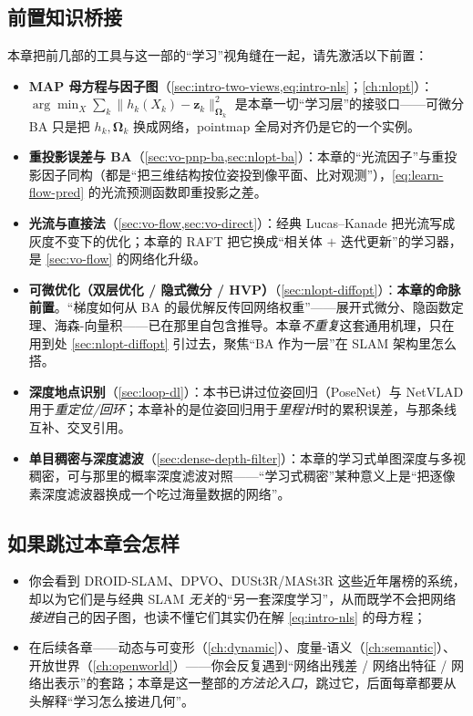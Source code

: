 \subsection*{前置知识桥接}
本章把前几部的工具与这一部的“学习”视角缝在一起，请先激活以下前置：
\begin{itemize}
  \item \textbf{MAP 母方程与因子图}（\cref{sec:intro-two-views,eq:intro-nls}；\cref{ch:nlopt}）：$\arg\min_X\sum_k\|h_k(X_k)-\mathbf{z}_k\|^2_{\boldsymbol\Omega_k}$ 是本章一切“学习层”的接驳口——可微分 BA 只是把 $h_k,\boldsymbol\Omega_k$ 换成网络，pointmap 全局对齐仍是它的一个实例。
  \item \textbf{重投影误差与 BA}（\cref{sec:vo-pnp-ba,sec:nlopt-ba}）：本章的“光流因子”与重投影因子同构（都是“把三维结构按位姿投到像平面、比对观测”），\cref{eq:learn-flow-pred} 的光流预测函数即重投影之差。
  \item \textbf{光流与直接法}（\cref{sec:vo-flow,sec:vo-direct}）：经典 Lucas--Kanade 把光流写成灰度不变下的优化；本章的 RAFT 把它换成“相关体 $+$ 迭代更新”的学习器，是 \cref{sec:vo-flow} 的网络化升级。
  \item \textbf{可微优化（双层优化 / 隐式微分 / HVP）}（\cref{sec:nlopt-diffopt}）：\textbf{本章的命脉前置}。“梯度如何从 BA 的最优解反传回网络权重”——展开式微分、隐函数定理、海森-向量积——已在那里自包含推导。本章\emph{不重复}这套通用机理，只在用到处 \cref{sec:nlopt-diffopt} 引过去，聚焦“BA 作为一层”在 SLAM 架构里怎么搭。
  \item \textbf{深度地点识别}（\cref{sec:loop-dl}）：本书已讲过位姿回归（PoseNet）与 NetVLAD 用于\emph{重定位/回环}；本章补的是位姿回归用于\emph{里程计}时的累积误差，与那条线互补、交叉引用。
  \item \textbf{单目稠密与深度滤波}（\cref{sec:dense-depth-filter}）：本章的学习式单图深度与多视稠密，可与那里的概率深度滤波对照——“学习式稠密”某种意义上是“把逐像素深度滤波器换成一个吃过海量数据的网络”。
\end{itemize}

\subsection*{如果跳过本章会怎样}
\begin{itemize}
  \item 你会看到 DROID-SLAM、DPVO、DUSt3R/MASt3R 这些近年屠榜的系统，却以为它们是与经典 SLAM \emph{无关}的“另一套深度学习”，从而既学不会把网络\emph{接进}自己的因子图，也读不懂它们其实仍在解 \cref{eq:intro-nls} 的母方程；
  \item 在后续各章——动态与可变形（\cref{ch:dynamic}）、度量-语义（\cref{ch:semantic}）、开放世界（\cref{ch:openworld}）——你会反复遇到“网络出残差 / 网络出特征 / 网络出表示”的套路；本章是这一整部的\emph{方法论入口}，跳过它，后面每章都要从头解释“学习怎么接进几何”。
\end{itemize}

